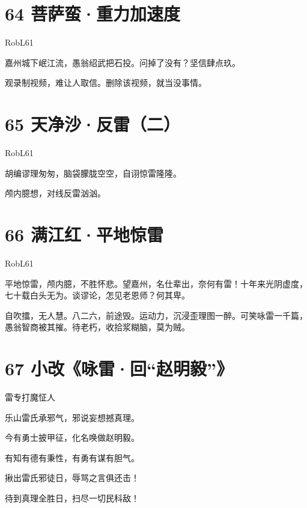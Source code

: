 \documentclass[UTF8,12pt,oneside]{ctexbook}
\begin{document}
        \newpage
        
        \section{64 菩萨蛮·重力加速度}
        \begin{center}
            RobL61
        \end{center}
        
        嘉州城下岷江流，愚翁绍武把石投。问掉了没有？坚信肆点玖。
        
        观录制视频，难让人取信。删除该视频，就当没事情。
        
        \section{65 天净沙·反雷（二）}
        \begin{center}
            RobL61
        \end{center}
        
        \begin{center}
        胡编谬理匆匆，脑袋朦胧空空，自诩惊雷隆隆。
        
        颅内臆想，对线反雷汹汹。
        \end{center}
        
        \section{66 满江红·平地惊雷}
        \begin{center}
            RobL61
        \end{center}
        
        平地惊雷，颅内臆，不胜怀悲。望嘉州，名仕辈出，奈何有雷！十年来光阴虚度，七十载白头无为。谈谬论，怎见老恩师？何其卑。
        
        自吹擂，无人慧。八二六，前途毁。运动力，沉浸歪理图一醉。可笑咏雷一千篇，愚翁智商被其摧。待老朽，收拾浆糊脑，莫为贼。
        
        \newpage
        
        \section{67 小改《咏雷·回“赵明毅”》}
        \begin{center}
            雷专打魔怔人
        \end{center}
        
        \begin{center}
            乐山雷氏承邪气，邪说妄想撼真理。
            
            今有勇士披甲征，化名唤做赵明毅。
            
            有知有德有秉性，有勇有谋有胆气。
            
            揪出雷氏邪徒日，辱骂之言俱还击！
            
            待到真理全胜日，扫尽一切民科敌！
        \end{center}
        ~\\
        
\end{document}

